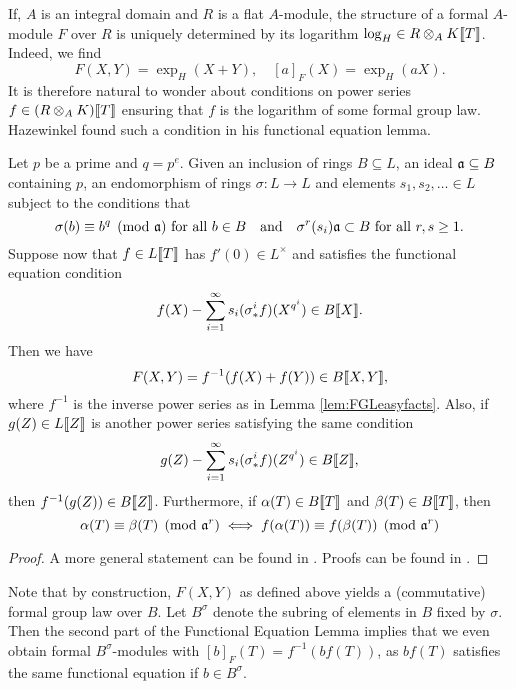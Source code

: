 If, $A$ is an integral domain and $R$ is a flat $A$-module, the structure of a formal
$A$-module $F$ over $R$ is uniquely determined by its logarithm $\log_H
\in R \otimes_A K \llbracket T \rrbracket$. Indeed, we find
\begin{equation*}
  F(X,Y) = \exp_H(X+Y), \quad [a]_F(X) = \exp_H(a X).
\end{equation*}
It is therefore natural to wonder about conditions on power series $f \in
(R\otimes_A K) \llbracket T \rrbracket$ ensuring that $f$ is the logarithm of some
formal group law. Hazewinkel found such a condition in his functional equation
lemma.

\begin{prop} 
  Let $p$ be a prime and $q = p^e$. Given an inclusion of rings $B \subseteq
  L$, an ideal $\mathfrak{a} \subseteq B$ containing $p$, an endomorphism of rings
  $\sigma: L \to L$ and elements $s_1, s_2, \dots \in L$ subject to the conditions
  that 
  \begin{equation*}
    \sigma(b) \equiv b^q \pmod {\mathfrak{a}} \text{ for all } b \in B \quad \text{and} \quad 
    \sigma^r(s_i) \mathfrak{a} \subset B \text{ for all } r,s \geq 1.
  \end{equation*}
  Suppose now that $f \in L\llbracket T \rrbracket$ has $f'(0) \in L^\times$ and
  satisfies the functional equation condition
  \begin{equation*}
    f(X) - \sum_{i=1}^\infty s_i (\sigma^i_* f)(X^{q^i}) \in B\llbracket X \rrbracket.
  \end{equation*}
  Then we have 
  \begin{equation*}
    F(X,Y) = f^{-1}(f(X) + f(Y)) \in B \llbracket X,Y \rrbracket,
  \end{equation*}
  where $f^{-1}$ is the inverse power series as in Lemma \ref{lem:FGLeasyfacts}.
  Also, if $g(Z) \in L\llbracket Z \rrbracket$ is another power series satisfying the 
  same condition
  \begin{equation*}
    g(Z) - \sum_{i=1}^\infty s_i (\sigma^i_* f)(Z^{q^i}) \in B\llbracket Z \rrbracket,
  \end{equation*}
  then $f^{-1}(g(Z)) \in B\llbracket Z \rrbracket$. 
  Furthermore, if $\alpha(T) \in B\llbracket T \rrbracket$ and $\beta(T) \in B \llbracket T \rrbracket$, then
  \begin{equation} \label{eq:funceqlemcongruence}
    \alpha(T) \equiv \beta(T) \pmod {\mathfrak{a}^r} \iff f(\alpha(T)) \equiv f(\beta(T))
    \pmod {\mathfrak{a}^r}
  \end{equation}

  \begin{proof}
    A more general statement can be found in \cite[Section
    2]{hazewinkel1979funceqexp}. Proofs can be found in \cite[Sections 2 and
    10]{hazewinkel1978formal}.
  \end{proof}
\end{prop}
Note that by construction, $F(X,Y)$ as defined above yields a (commutative)
formal group law over $B$. 
Let $B^\sigma$ denote the subring of elements in $B$ fixed by $\sigma$. Then 
the second part of the Functional Equation Lemma implies that we even obtain
formal $B^\sigma$-modules with $[b]_F(T) = f^{-1}(b f(T))$, as $bf(T)$
satisfies the same functional equation if $b \in B^\sigma$. 

